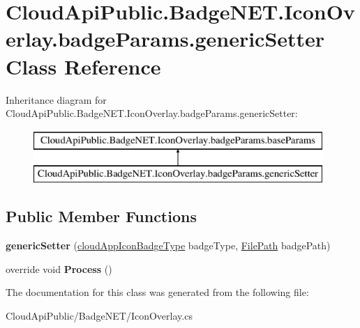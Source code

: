 \hypertarget{class_cloud_api_public_1_1_badge_n_e_t_1_1_icon_overlay_1_1badge_params_1_1generic_setter}{\section{Cloud\-Api\-Public.\-Badge\-N\-E\-T.\-Icon\-Overlay.\-badge\-Params.\-generic\-Setter Class Reference}
\label{class_cloud_api_public_1_1_badge_n_e_t_1_1_icon_overlay_1_1badge_params_1_1generic_setter}
}
Inheritance diagram for Cloud\-Api\-Public.\-Badge\-N\-E\-T.\-Icon\-Overlay.\-badge\-Params.\-generic\-Setter\-:\begin{figure}[H]
\begin{center}
\leavevmode
\includegraphics[height=2.000000cm]{class_cloud_api_public_1_1_badge_n_e_t_1_1_icon_overlay_1_1badge_params_1_1generic_setter}
\end{center}
\end{figure}
\subsection*{Public Member Functions}
\begin{DoxyCompactItemize}
\item 
\hypertarget{class_cloud_api_public_1_1_badge_n_e_t_1_1_icon_overlay_1_1badge_params_1_1generic_setter_ac6db110f8d4e5fe04b47658a4f9b1d0e}{{\bfseries generic\-Setter} (\hyperlink{namespace_cloud_api_public_1_1_badge_n_e_t_afab91a750338fef6bd4ef08f5381c4e4}{cloud\-App\-Icon\-Badge\-Type} badge\-Type, \hyperlink{class_cloud_api_public_1_1_model_1_1_file_path}{File\-Path} badge\-Path)}\label{class_cloud_api_public_1_1_badge_n_e_t_1_1_icon_overlay_1_1badge_params_1_1generic_setter_ac6db110f8d4e5fe04b47658a4f9b1d0e}

\item 
\hypertarget{class_cloud_api_public_1_1_badge_n_e_t_1_1_icon_overlay_1_1badge_params_1_1generic_setter_a119f96b8cfc81af0fb79d76b11447276}{override void {\bfseries Process} ()}\label{class_cloud_api_public_1_1_badge_n_e_t_1_1_icon_overlay_1_1badge_params_1_1generic_setter_a119f96b8cfc81af0fb79d76b11447276}

\end{DoxyCompactItemize}


The documentation for this class was generated from the following file\-:\begin{DoxyCompactItemize}
\item 
Cloud\-Api\-Public/\-Badge\-N\-E\-T/Icon\-Overlay.\-cs\end{DoxyCompactItemize}
